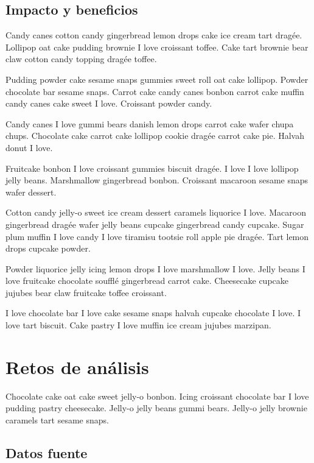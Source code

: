 \subsection{Impacto y beneficios}
\label{subsection:prop:impacto}

Candy canes cotton candy gingerbread lemon drops cake ice cream tart dragée. Lollipop oat cake pudding brownie I love croissant toffee. Cake tart brownie bear claw cotton candy topping dragée toffee.

Pudding powder cake sesame snaps gummies sweet roll oat cake lollipop. Powder chocolate bar sesame snaps. Carrot cake candy canes bonbon carrot cake muffin candy canes cake sweet I love. Croissant powder candy.

Candy canes I love gummi bears danish lemon drops carrot cake wafer chupa chups. Chocolate cake carrot cake lollipop cookie dragée carrot cake pie. Halvah donut I love.

Fruitcake bonbon I love croissant gummies biscuit dragée. I love I love lollipop jelly beans. Marshmallow gingerbread bonbon. Croissant macaroon sesame snaps wafer dessert.

Cotton candy jelly-o sweet ice cream dessert caramels liquorice I love. Macaroon gingerbread dragée wafer jelly beans cupcake gingerbread candy cupcake. Sugar plum muffin I love candy I love tiramisu tootsie roll apple pie dragée. Tart lemon drops cupcake powder.

Powder liquorice jelly icing lemon drops I love marshmallow I love. Jelly beans I love fruitcake chocolate soufflé gingerbread carrot cake. Cheesecake cupcake jujubes bear claw fruitcake toffee croissant.

I love chocolate bar I love cake sesame snaps halvah cupcake chocolate I love. I love tart biscuit. Cake pastry I love muffin ice cream jujubes marzipan.

\section{Retos de análisis}
\label{section:retos}

Chocolate cake oat cake sweet jelly-o bonbon. Icing croissant chocolate bar I love pudding pastry cheesecake. Jelly-o jelly beans gummi bears. Jelly-o jelly brownie caramels tart sesame snaps.

\subsection{Datos fuente}
\label{subsection:retos:datos}

